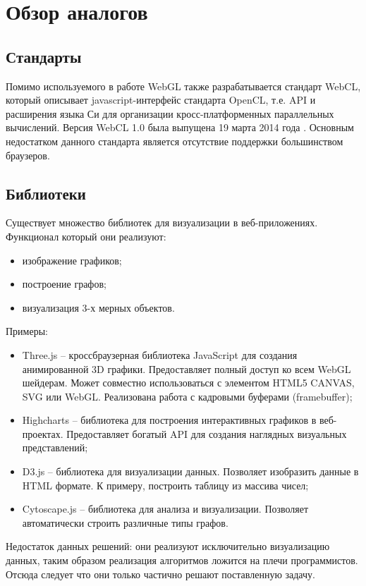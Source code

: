 \newpage
\section{Обзор аналогов}

\subsection{Стандарты}

Помимо используемого в работе WebGL также разрабатывается стандарт WebCL, который описывает 
javascript-интерфейс стандарта OpenCL, т.е. API и расширения языка Си для организации
кросс-платформенных параллельных вычислений. Версия WebCL 1.0 была выпущена 19 марта 2014 года \cite{webcl10}.
Основным недостатком данного стандарта является отсутствие поддержки большинством браузеров.

\subsection{Библиотеки}
Существует множество библиотек для визуализации в веб-приложениях. Функционал который они реализуют:
\begin{itemize}
  \item изображение графиков;
  \item построение графов;
  \item визуализация 3-х мерных объектов.
\end{itemize}

Примеры:
\begin{itemize}
  \item Three.js -- кроссбраузерная библиотека JavaScript для создания анимированной 3D графики.
    Предоставляет полный доступ ко всем WebGL шейдерам. Может совместно использоваться с элементом
    HTML5 CANVAS, SVG или WebGL. Реализована работа с кадровыми буферами (framebuffer);

  \item Highcharts -- библиотека для построения интерактивных графиков в веб-проектах. Предоставляет
    богатый API для создания наглядных визуальных представлений;

  \item D3.js -- библиотека для визуализации данных. Позволяет изобразить данные в HTML формате. 
    К примеру, построить таблицу из массива чисел;
    
  \item Cytoscape.js -- библиотека для анализа и визуализации. Позволяет автоматически 
    строить различные типы графов.
\end{itemize}

Недостаток данных решений: они реализуют исключительно визуализацию данных, таким образом реализация
алгоритмов ложится на плечи программистов. Отсюда следует что они только частично решают поставленную
задачу.
